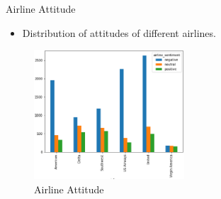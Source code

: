 \documentclass[
 size=14pt,
 paper=smartboard,  %
 mode=present, 		%
 display=slides, 	%
 style=tuliplab,  	%
 pauseslide,
 fleqn,leqno]{powerdot}
\begin{document}
\begin{slide}[toc=,bm=]{Airline Attitude}
  \begin{itemize}
    \item Distribution of attitudes of different airlines.
  \end{itemize}
  \begin{figure}[htbp]
    \centering
      \includegraphics[width=0.5\textwidth]{figures//airlineattitude.eps}
      \caption{Airline Attitude}
 \end{figure}
\end{slide}
\end{document}
